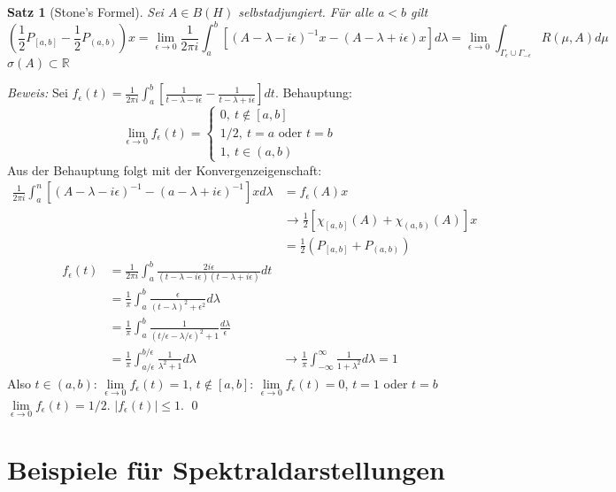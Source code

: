 \documentclass[12pt]{extreport} %
\newtheorem{Satz}{Satz}[subsection]
\numberwithin{equation}{section}
\newcommand{\R}{\mathbb{R}} %
\newcommand{\Bew}{\emph{Beweis: }}
\begin{document}
	\begin{Satz}[Stone's Formel]
		Sei $A\in B(H)$ selbstadjungiert. Für alle $a<b$ gilt 
		$$\left(\frac{1}{2}P_{[a,b]} - \frac{1}{2}P_{(a,b)}\right)x = \lim\limits_{\epsilon\rightarrow 0} \frac{1}{2\pi i}\int_{a}^{b}[(A-\lambda-i\epsilon)^{-1}x- (A-\lambda+i\epsilon)x]d\lambda = \lim\limits_{\epsilon\rightarrow 0 }\int_{\Gamma_\epsilon\cup \Gamma_{-\epsilon}} R(\mu,A)d\mu$$
		$\sigma(A) \subset\R$
	\end{Satz}
	
	\Bew Sei $f_\epsilon(t) = \frac{1}{2\pi i}\int_{a}^{b}\left[\frac{1}{t-\lambda-i\epsilon} -\frac{1}{t-\lambda+i\epsilon}\right] dt$. Behauptung:
	$$\lim\limits_{\epsilon\rightarrow 0}f_\epsilon(t) = \left\{\begin{array}{l}
	0,~ t\notin [a,b]\\
	1/2,~ t=a \text{ oder } t= b\\
	1,~ t\in (a,b)
	\end{array}
	\right.$$
	Aus der Behauptung folgt mit der Konvergenzeigenschaft:
	\begin{align*}
		\frac{1}{2\pi i} \int_{a}^{n}[(A-\lambda-i\epsilon)^{-1}-(a-\lambda+i\epsilon)^{-1}]x d\lambda &= f_\epsilon(A)x \\
		&\rightarrow \frac{1}{2}[\chi_{[a,b]}(A) + \chi_{(a,b)} (A)]x\\
		&= \frac{1}{2}\left(P_{[a,b]}+P_{(a,b)}\right)
	\end{align*}
	\begin{align*}
		f_\epsilon(t) &= \frac{1}{2\pi i}\int_a^b \frac{2i\epsilon}{(t-\lambda-i\epsilon)(t-\lambda+i\epsilon)}dt\\
		&= \frac{1}{\pi}\int_a^b \frac{\epsilon}{(t-\lambda)^2+\epsilon^2}d\lambda\\
		&= \frac{1}{\pi}\int_a^b \frac{1}{(t/\epsilon-\lambda/\epsilon)^2 + 1}\frac{d\lambda}{\epsilon}\\
		&= \frac{1}{\pi}\int_{a/\epsilon}^{b/\epsilon}\frac{1}{\lambda^2 + 1}d\lambda
		&\rightarrow \frac{1}{\pi}\int_{-\infty}^{\infty}\frac{1}{1+\lambda^2}d\lambda = 1
	\end{align*}
	Also $t\in (a,b)$: $\lim\limits_{\epsilon\rightarrow 0}f_\epsilon(t) = 1$, $t\notin [a,b]$: $\lim\limits_{\epsilon\rightarrow 0}f_\epsilon(t) = 0$, $t = 1$ oder $t = b$ $\lim\limits_{\epsilon\rightarrow 0}f_\epsilon(t) = 1/2$. $|f_\epsilon(t)| \leq 1$.
	\qed
	
	\section{Beispiele für Spektraldarstellungen} 
	
\end{document}
